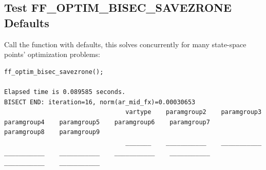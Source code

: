 \documentclass[
]{book}
\begin{document}
\hypertarget{test-ff_optim_bisec_savezrone-defaults}{%
\subsection{Test FF\_OPTIM\_BISEC\_SAVEZRONE Defaults}\label{test-ff_optim_bisec_savezrone-defaults}}

Call the function with defaults, this solves concurrently for many
state-space points' optimization problems:

\begin{verbatim}
ff_optim_bisec_savezrone();

Elapsed time is 0.089585 seconds.
BISECT END: iteration=16, norm(ar_mid_fx)=0.00030653
                                 vartype    paramgroup2    paramgroup3    paramgroup4    paramgroup5    paramgroup6    paramgroup7    paramgroup8    paramgroup9
                                 _______    ___________    ___________    ___________    ___________    ___________    ___________    ___________    ___________


\end{verbatim}
\end{document}
